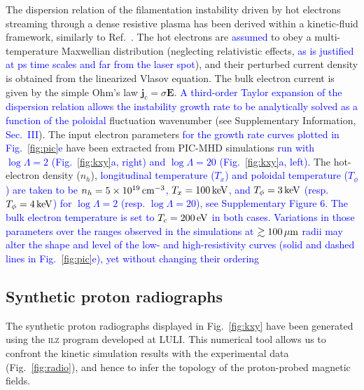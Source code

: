 \documentclass[aps,showpacs,superscriptaddress]{revtex4}
\begin{document}
The dispersion relation of the filamentation instability driven by hot electrons streaming through a dense resistive plasma has been derived within a kinetic-fluid framework, similarly to Ref.~\cite{POP_Gremillet_2002}. The hot electrons are \textcolor{blue}{assumed} to obey a multi-temperature Maxwellian distribution (neglecting relativistic effects, \textcolor{blue}{as is justified at ps time scales and far from the laser spot}), and their perturbed current density is obtained from the linearized Vlasov equation. The bulk electron current is given by the simple Ohm's law $\mathbf{j}_c=\sigma \mathbf{E}$.
\textcolor{blue}{A third-order Taylor expansion of the dispersion relation allows the instability growth rate to be analytically solved as a function of the poloidal} fluctuation wavenumber (see Supplementary Information, \textcolor{blue}{Sec.~III}). The input electron parameters \textcolor{blue}{for the growth rate curves plotted in Fig.~\ref{fig:pic}e} have been extracted from PIC-MHD simulations \textcolor{blue}{run with $\log \Lambda = 2$ (Fig.~\ref{fig:kxy}a, right) and $\log \Lambda=20$ (Fig.~\ref{fig:kxy}a, left).} The hot-electron density ($n_h$), \textcolor{blue}{longitudinal temperature ($T_x$) and poloidal temperature ($T_\phi$) are taken to be $n_h=5\times 10^{19}\,\rm cm^{-3}$, $T_x=100\,\rm keV$, and $T_\phi=3\,\rm keV$ (resp. $T_\phi = 4\,\rm keV$) for $\log \Lambda=2$ (resp. $\log \Lambda=20$), see Supplementary Figure 6. The bulk electron temperature is set to $T_c=200\,\rm eV$ in both cases. Variations in those parameters over the ranges observed in the simulations at $\gtrsim 100\,\rm \mu m$ radii may alter the shape and level of the low- and high-resistivity curves (solid and dashed lines in Fig.~\ref{fig:pic}e), yet without changing their ordering}

\subsection*{Synthetic proton radiographs}

The synthetic proton radiographs displayed in Fig.~\ref{fig:kxy} have been generated using the \textsc{ilz} program developed at LULI. This numerical tool allows us to confront the kinetic simulation results with the experimental data (Fig.~\ref{fig:radio}), and hence to infer the topology of the proton-probed magnetic fields.
\end{document}
